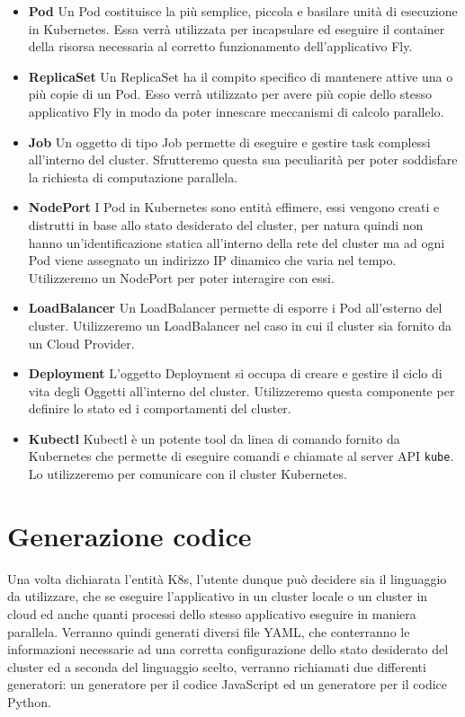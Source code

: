 \begin{itemize}
  \item\textbf{Pod} Un Pod costituisce la più semplice, piccola e basilare unità di esecuzione in Kubernetes. Essa verrà utilizzata per incapsulare ed eseguire il container della risorsa necessaria al corretto funzionamento
  dell'applicativo Fly.
  \item\textbf{ReplicaSet} Un ReplicaSet ha il compito specifico di mantenere attive una o più copie di un Pod. Esso verrà utilizzato per avere più copie dello stesso applicativo Fly in modo da poter innescare meccanismi di calcolo parallelo.
  \item\textbf{Job} Un oggetto di tipo Job permette di eseguire e gestire task complessi all'interno del cluster. Sfrutteremo questa sua peculiarità per poter soddisfare la richiesta di computazione parallela.
  \item\textbf{NodePort} I Pod in Kubernetes sono entità effimere, essi vengono creati e distrutti in base allo stato desiderato del cluster, per natura quindi non hanno un'identificazione statica all'interno della rete del cluster ma ad ogni Pod viene assegnato un indirizzo IP dinamico che varia nel tempo.
  Utilizzeremo un NodePort per poter interagire con essi.
  \item\textbf{LoadBalancer} Un LoadBalancer permette di esporre i Pod all'esterno del cluster. Utilizzeremo un LoadBalancer nel caso in cui il cluster sia fornito da un Cloud Provider.
  \item\textbf{Deployment} L'oggetto Deployment si occupa di creare e gestire il ciclo di vita degli Oggetti all'interno del cluster. Utilizzeremo questa componente per definire lo stato ed i comportamenti del cluster.
  \item\textbf{Kubectl} Kubectl è un potente tool da linea di comando fornito da Kubernetes che permette di eseguire comandi e chiamate al server API \verb|kube|. Lo utilizzeremo per comunicare con il cluster Kubernetes. 
\end{itemize}

\section{Generazione codice}
Una volta dichiarata l'entità K8s, l'utente dunque può decidere sia il linguaggio da utilizzare, che se eseguire l'applicativo in un cluster locale o un cluster in cloud ed anche quanti processi dello stesso applicativo eseguire in maniera parallela. Verranno quindi generati diversi file YAML, che conterranno le informazioni necessarie ad una corretta configurazione dello stato desiderato del cluster ed a seconda del linguaggio scelto, 
verranno richiamati due differenti generatori: un generatore per il codice JavaScript ed un generatore per il codice Python.

